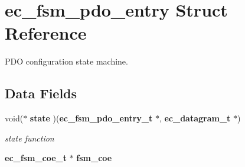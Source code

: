 \section{ec\-\_\-fsm\-\_\-pdo\-\_\-entry Struct Reference}
\label{structec__fsm__pdo__entry}


P\-D\-O configuration state machine.  


\subsection*{Data Fields}
\begin{DoxyCompactItemize}
\item 
void($\ast$ {\bf state} )({\bf ec\-\_\-fsm\-\_\-pdo\-\_\-entry\-\_\-t} $\ast$, {\bf ec\-\_\-datagram\-\_\-t} $\ast$)\label{structec__fsm__pdo__entry_ac55bdbce3537777fc9e3eb5d5e6a244d}

\begin{DoxyCompactList}\small\item\em state function \end{DoxyCompactList}\item 
{\bf ec\-\_\-fsm\-\_\-coe\-\_\-t} $\ast$ {\bf fsm\-\_\-coe}\label{structec__fsm__pdo__entry_a61449a8e0440b2e79a917d3e8fd96105}


\end{DoxyCompactItemize}
